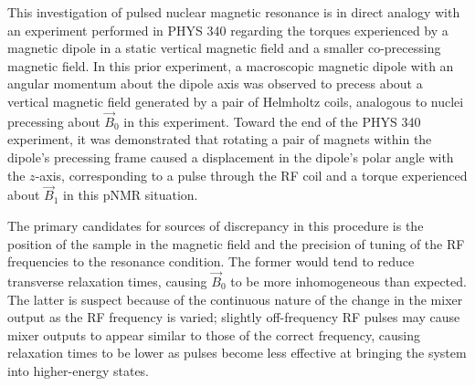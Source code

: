 \documentclass[11pt]{article}
\begin{document}
This investigation of pulsed nuclear magnetic resonance is in direct
analogy with an experiment performed in PHYS 340 regarding the
torques experienced by a magnetic dipole in
a static vertical magnetic field and a smaller co-precessing magnetic
field. In this prior experiment, a macroscopic magnetic dipole with
an angular momentum
about the dipole axis was observed to precess about a vertical magnetic field
generated by a pair
of Helmholtz coils, analogous to nuclei precessing about $\vec B_0$
in this experiment. Toward the end of the PHYS 340 experiment, it was
demonstrated that rotating
a pair of magnets within the dipole's precessing frame caused a
displacement in the dipole's polar
angle with the $z$-axis, corresponding to a pulse through the RF coil
and a torque experienced about $\vec B_1$ in this pNMR situation.

The primary candidates for sources of discrepancy in this procedure is
the position of the sample in the magnetic field and the precision of tuning of
the RF frequencies to the resonance condition. The former would tend to reduce
transverse relaxation times, causing $\vec B_0$ to be more inhomogeneous
than expected. The latter is suspect because of the continuous nature of the
change in the mixer output as the RF frequency is varied; slightly
off-frequency RF pulses may cause mixer outputs to appear similar
to those of the correct frequency, causing relaxation times to be
lower as pulses become less effective at bringing the system into
higher-energy states.



\end{document}
